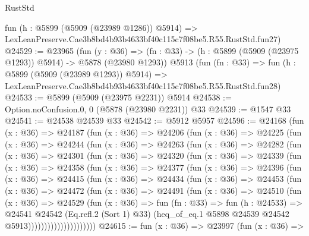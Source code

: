\begin{lexlean}{RustStd}
\begin{coremodule}
{{    fun (h : @5899 (@5909 (@23989 @1286)) @5914) =>
    LexLeanPreserve.Cae3b8bd4b93b4633bf40c115c7f08be5.R55.RustStd.fun27)
@24529 := @23965
    (fun (y : @36) =>
    (fn : @33) -> (h : @5899 (@5909 (@23975 @1293)) @5914) -> @5878 (@23980 @1293))
    @5913
    (fun (fn : @33) =>
    fun (h : @5899 (@5909 (@23989 @1293)) @5914) =>
    LexLeanPreserve.Cae3b8bd4b93b4633bf40c115c7f08be5.R55.RustStd.fun28)
@24533 := @5899 (@5909 (@23975 @2231)) @5914
@24538 := Option.noConfusion.{0, 0} (@5878 (@23980 @2231)) @33
@24539 := @1547 @33
@24541 := @24538 @24539 @33
@24542 := @5912 @5957
@24596 := @24168
    (fun (x : @36) =>
    @24187
      (fun (x : @36) =>
      @24206
        (fun (x : @36) =>
        @24225
          (fun (x : @36) =>
          @24244
            (fun (x : @36) =>
            @24263
              (fun (x : @36) =>
              @24282
                (fun (x : @36) =>
                @24301
                  (fun (x : @36) =>
                  @24320
                    (fun (x : @36) =>
                    @24339
                      (fun (x : @36) =>
                      @24358
                        (fun (x : @36) =>
                        @24377
                          (fun (x : @36) =>
                          @24396
                            (fun (x : @36) =>
                            @24415
                              (fun (x : @36) =>
                              @24434
                                (fun (x : @36) =>
                                @24453
                                  (fun (x : @36) =>
                                  @24472
                                    (fun (x : @36) =>
                                    @24491
                                      (fun (x : @36) =>
                                      @24510
                                        (fun (x : @36) =>
                                        @24529
                                          (fun (x : @36) =>
                                          fun (fn : @33) =>
                                          fun (h : @24533) =>
                                          @24541
                                            @24542
                                            (Eq.refl.{2} (Sort 1) @33)
                                            (heq_of_eq.{1}
                                              @5898
                                              @24539
                                              @24542
                                              @5913)))))))))))))))))))))
@24615 := fun (x : @36) =>
  @23997
    (fun (x : @36) =>
}}
\end{coremodule}
\end{lexlean}

